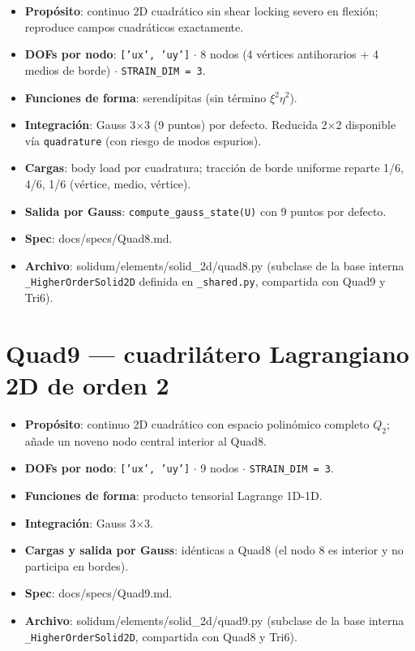 \documentclass[11pt,letterpaper,oneside]{report}
\begin{document}
\begin{itemize}
  \item \textbf{Propósito}: continuo 2D cuadrático sin shear locking severo en flexión; reproduce campos cuadráticos exactamente.
  \item \textbf{DOFs por nodo}: \texttt{['ux', 'uy']} \ensuremath{\cdot} 8 nodos (4 vértices antihorarios + 4 medios de borde) \ensuremath{\cdot} \texttt{STRAIN\_DIM = 3}.
  \item \textbf{Funciones de forma}: serendípitas (sin término \ensuremath{\xi}\ensuremath{^{2}}\ensuremath{\eta}\ensuremath{^{2}}).
  \item \textbf{Integración}: Gauss 3\ensuremath{\times}3 (9 puntos) por defecto. Reducida 2\ensuremath{\times}2 disponible vía \texttt{quadrature} (con riesgo de modos espurios).
  \item \textbf{Cargas}: body load por cuadratura; tracción de borde uniforme reparte 1/6, 4/6, 1/6 (vértice, medio, vértice).
  \item \textbf{Salida por Gauss}: \texttt{compute\_gauss\_state(U)} con 9 puntos por defecto.
  \item \textbf{Spec}: docs/specs/Quad8.md.
  \item \textbf{Archivo}: solidum/elements/solid\_2d/quad8.py (subclase de la base interna \texttt{\_HigherOrderSolid2D} definida en \texttt{\_shared.py}, compartida con Quad9 y Tri6).
\end{itemize}


\section{Quad9 --- cuadrilátero Lagrangiano 2D de orden 2}

\begin{itemize}
  \item \textbf{Propósito}: continuo 2D cuadrático con espacio polinómico completo $Q_2$; añade un noveno nodo central interior al Quad8.
  \item \textbf{DOFs por nodo}: \texttt{['ux', 'uy']} \ensuremath{\cdot} 9 nodos \ensuremath{\cdot} \texttt{STRAIN\_DIM = 3}.
  \item \textbf{Funciones de forma}: producto tensorial Lagrange 1D-1D.
  \item \textbf{Integración}: Gauss 3\ensuremath{\times}3.
  \item \textbf{Cargas y salida por Gauss}: idénticas a Quad8 (el nodo 8 es interior y no participa en bordes).
  \item \textbf{Spec}: docs/specs/Quad9.md.
  \item \textbf{Archivo}: solidum/elements/solid\_2d/quad9.py (subclase de la base interna \texttt{\_HigherOrderSolid2D}, compartida con Quad8 y Tri6).
\end{itemize}
\end{document}
